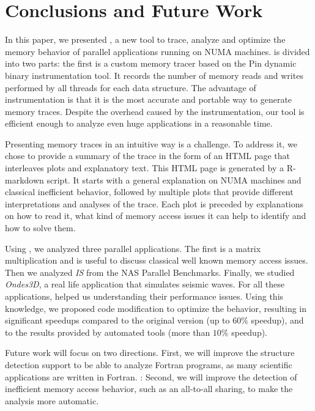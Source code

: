
\section{Conclusions and Future Work}
\label{sec:concl}

In this paper, we presented \TABARNAC, a new tool to trace, analyze and
optimize the memory behavior of parallel applications running on NUMA
machines. \TABARNAC is divided into two parts: the first is a custom memory tracer
based on the Pin dynamic binary instrumentation tool. It records the
number of memory reads and writes performed by all threads for each data structure.
The advantage of instrumentation is that it is the most
accurate and portable way to generate memory traces.
Despite the overhead caused by the instrumentation, our tool is efficient enough to analyze even huge applications in a reasonable time.

Presenting memory traces in an intuitive way is a challenge. To address it, we
chose to provide a summary of the trace in the form of an HTML page that
interleaves plots and explanatory text. This HTML page is generated by a R-markdown
script. It starts with a general explanation on NUMA machines and classical
inefficient behavior, followed by multiple plots that provide different
interpretations and analyses of the trace. Each plot is preceded by explanations on how to
read it, what kind of memory access issues it can help to identify and how to solve them.

Using \TABARNAC, we analyzed three parallel applications. The first is a
matrix multiplication and is useful to discuss classical well known memory access issues.
Then we analyzed \emph{IS} from the NAS Parallel Benchmarks. Finally, we studied
\emph{Ondes3D}, a real life application that simulates seismic waves. For all
these applications, \TABARNAC helped us understanding their performance issues.
Using this knowledge, we proposed code modification to optimize the behavior, resulting in
significant speedups compared to the original version (up to $60\%$ speedup),
and to the results provided by automated tools (more than $10\%$ speedup).

Future work will focus on two directions. First, we will improve the
structure detection support to be able to analyze Fortran programs, as many
scientific applications are written in Fortran. : Second, we will improve the
detection of inefficient memory access behavior, such as an all-to-all
sharing, to make the analysis more automatic.
